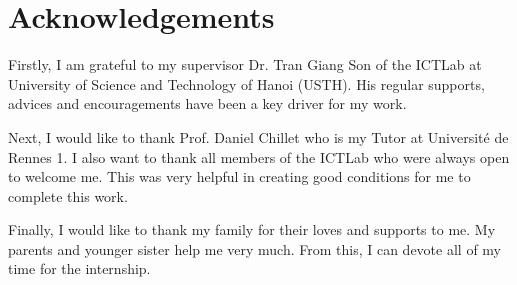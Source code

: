 \chapter*{Acknowledgements}

Firstly, I am grateful to my supervisor Dr. Tran Giang Son of the ICTLab at University of Science and Technology of Hanoi (USTH). His regular supports, advices and encouragements have been a key driver for my work.


Next, I would like to thank Prof. Daniel Chillet who is my Tutor at Université de Rennes 1. I also want to thank all members of the ICTLab who were always open to welcome me. This was very helpful in creating good conditions for me to complete this work.


Finally, I would like to thank my family for their loves and supports to me. My parents and younger sister help me very much. From this, I can devote all of my time for the  internship.